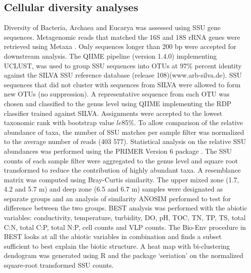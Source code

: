 \subsection{Cellular diversity analyses}
Diversity of Bacteria, Archaea and Eucarya was assessed using \ac{SSU} gene sequences. 
Metagenomic reads that matched the 16S and 18S \ac{rRNA} genes were retrieved using Metaxa \cite{Bengtsson2011}. 
Only sequences longer than 200 bp were accepted for downstream analysis. 
The \ac{QIIME} pipeline (version 1.4.0) \cite{Caporaso2010} implementing UCLUST, was used to group \ac{SSU} sequences into \acp{OTU} at 97\% percent identity against the SILVA \ac{SSU} reference database (release 108)(www.arb-silva.de). 
\ac{SSU} sequences that did not cluster with sequences from SILVA were allowed to form new \acp{OTU} (no suppression). 
A representative sequence from each \ac{OTU} was chosen and classified to the genus level using \ac{QIIME} implementing the \ac{RDP} classifier \cite{Wang2007} trained against SILVA. 
Assignments were accepted to the lowest taxonomic rank with bootstrap value $le$85\%. 
To allow comparison of the relative abundance of taxa, the number of \ac{SSU} matches per sample filter was normalized to the average number of reads (403 577). 
Statistical analysis on the relative \ac{SSU} abundances was performed using the PRIMER Version 6 package \cite{Clarke2006}. 
The \ac{SSU} counts of each sample filter were aggregated to the genus level and square root transformed to reduce the contribution of highly abundant taxa. 
A resemblance matrix was computed using Bray-Curtis similarity. 
The upper mixed zone (1.7, 4.2 and 5.7 m) and deep zone (6.5 and 6.7 m) samples were designated as separate groups and an analysis of similarity \ac{ANOSIM} performed to test for difference between the two groups. 
BEST analysis was performed with the abiotic variables: conductivity, temperature, turbidity, \ac{DO}, pH, \ac{TOC}, \ac{TN}, \ac{TP}, \ac{TS}, total C:N, total C:P, total N:P, cell counts and \ac{VLP} counts. 
The Bio-Env procedure in BEST looks at all the abiotic variables in combination and finds a subset sufficient to best explain the biotic structure. 
A heat map with bi-clustering dendogram was generated using R and the package ‘seriation’ \cite{Hahsler2008} on the normalized square-root transformed \ac{SSU} counts.


